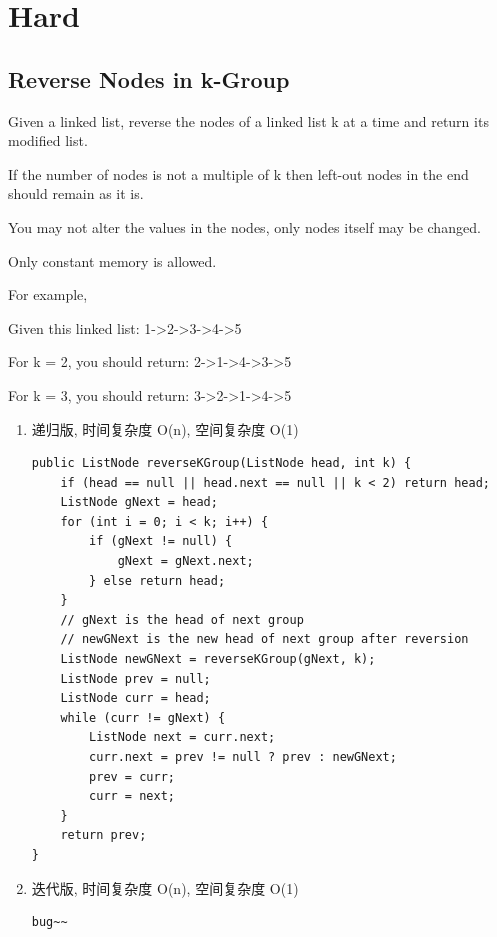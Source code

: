 \documentclass[12pt]{book}
\begin{document}
\section{Hard}
\label{sec-3-3}
\subsection{Reverse Nodes in k-Group}
\label{sec-3-3-1}

Given a linked list, reverse the nodes of a linked list k at a time and return its modified list.

If the number of nodes is not a multiple of k then left-out nodes in the end should remain as it is.

You may not alter the values in the nodes, only nodes itself may be changed.

Only constant memory is allowed.

For example,

Given this linked list: 1->2->3->4->5

For k = 2, you should return: 2->1->4->3->5

For k = 3, you should return: 3->2->1->4->5

\begin{enumerate}
\item 递归版, 时间复杂度 O(n), 空间复杂度 O(1)
\label{sec-3-3-1-1}

\lstset{language=java,label= ,caption= ,numbers=none}
\begin{lstlisting}
public ListNode reverseKGroup(ListNode head, int k) {
    if (head == null || head.next == null || k < 2) return head;
    ListNode gNext = head;
    for (int i = 0; i < k; i++) {
        if (gNext != null) {
            gNext = gNext.next;
        } else return head;
    }
    // gNext is the head of next group
    // newGNext is the new head of next group after reversion
    ListNode newGNext = reverseKGroup(gNext, k);
    ListNode prev = null;
    ListNode curr = head;
    while (curr != gNext) {
        ListNode next = curr.next;
        curr.next = prev != null ? prev : newGNext;
        prev = curr;
        curr = next;
    }
    return prev;
}
\end{lstlisting}

\item 迭代版, 时间复杂度 O(n), 空间复杂度 O(1)
\label{sec-3-3-1-2}

\lstset{language=java,label= ,caption= ,numbers=none}
\begin{lstlisting}
bug~~
\end{lstlisting}
\end{enumerate}
\end{document}

